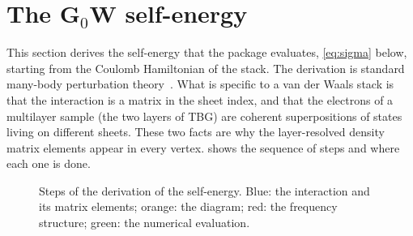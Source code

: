 \section{The G$_0$W self-energy}
\label{sec:selfenergy}

This section derives the self-energy that the package evaluates, \cref{eq:sigma} below, starting from the
Coulomb Hamiltonian of the stack. The derivation is standard many-body perturbation
theory~\cite{Hedin1965,HedinLundqvist1970,Mahan,BruusFlensberg,AryasetiawanGunnarsson1998}. What is
specific to a van der Waals stack is that the interaction is a matrix in the sheet index, and that the
electrons of a multilayer sample (the two layers of TBG) are coherent superpositions of states living on
different sheets. These two facts are why the layer-resolved density matrix elements appear in every
vertex.  shows the sequence of steps and where each one is done.

\begin{figure}[h]
\centering
{}
\caption{Steps of the derivation of the self-energy. Blue: the interaction and its matrix elements; orange:
the diagram; red: the frequency structure; green: the numerical evaluation.}
\label{fig:sigma_roadmap}
\end{figure}

